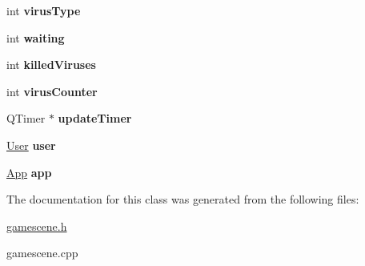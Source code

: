 \begin{DoxyCompactItemize}
\item 
\mbox{\label{classGameScene_a53eb68698c6aba5a3e33e3d2d257ac0d}} 
int {\bfseries virus\+Type}
\item 
\mbox{\label{classGameScene_a2135250d7ba76219e6f040650d4310db}} 
int {\bfseries waiting}
\item 
\mbox{\label{classGameScene_a75ddad3ea4fc37e8422e922d8c09983d}} 
int {\bfseries killed\+Viruses}
\item 
\mbox{\label{classGameScene_a8fbc3208cbd87d5d4cf8513ebc75f596}} 
int {\bfseries virus\+Counter}
\item 
\mbox{\label{classGameScene_a0e9e06284acc33c9ca9461a47f2ef681}} 
Q\+Timer $\ast$ {\bfseries update\+Timer}
\item 
\mbox{\label{classGameScene_a8fb317eb7fb9a33aca201a61c300922a}} 
\hyperlink{classUser}{User} {\bfseries user}
\item 
\mbox{\label{classGameScene_a33821265495463e9cccbcac4c91a0f6f}} 
\hyperlink{classApp}{App} {\bfseries app}
\end{DoxyCompactItemize}


The documentation for this class was generated from the following files\+:\begin{DoxyCompactItemize}
\item 
\hyperlink{gamescene_8h}{gamescene.\+h}\item 
gamescene.\+cpp\end{DoxyCompactItemize}
